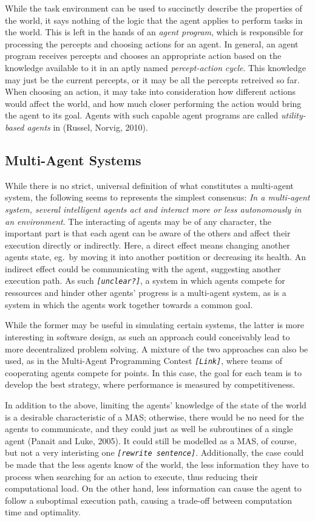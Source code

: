 While the task environment can be used to succinctly describe the
properties of the world, it says nothing of the logic that the agent
applies to perform tasks in the world. This is left in the hands of
an \emph{agent program}, which is responsible for processing the percepts
and choosing actions for an agent. In general, an agent program receives
percepts and chooses an appropriate action based on the knowledge
available to it in an aptly named \emph{percept-action} \emph{cycle}.
This knowledge may just be the current percepts, or it may be all
the percepts retreived so far. When choosing an action, it may take
into consideration how different actions would affect the world, and
how much closer performing the action would bring the agent to its
goal. Agents with such capable agent programs are called \emph{utility-based
agents} in (Russel, Norvig, 2010).


\subsection{Multi-Agent Systems}

While there is no strict, universal definition of what constitutes
a multi-agent system, the following seems to represents the simplest
consensus: \emph{In a multi-agent system, several intelligent agents
act and interact more or less autonomously in an environment}. The
interacting of agents may be of any character, the important part
is that each agent can be aware of the others and affect their execution
directly or indirectly. Here, a direct effect means changing another
agents state, eg.\ by moving it into another postition or decreasing
its health. An indirect effect could be communicating with the agent,
suggesting another execution path. As such \texttt{\emph{{[}unclear?{]}}},
a system in which agents compete for ressources and hinder other agents'
progress is a multi-agent system, as is a system in which the agents
work together towards a common goal. 

While the former may be useful in simulating certain systems, the
latter is more interesting in software design, as such an approach
could conceivably lead to more decentralized problem solving. A mixture
of the two approaches can also be used, as in the Multi-Agent Programming
Contest \texttt{\emph{{[}Link{]}}}, where teams of cooperating agents
compete for points. In this case, the goal for each team is to develop
the best strategy, where performance is measured by competitiveness.

In addition to the above, limiting the agents' knowledge of the state
of the world is a desirable characteristic of a MAS; otherwise, there
would be no need for the agents to communicate, and they could just
as well be subroutines of a single agent (Panait and Luke, 2005).
It could still be modelled as a MAS, of course, but not a very interisting
one \texttt{\emph{{[}rewrite sentence{]}}}. Additionally, the case
could be made that the less agents know of the world, the less information
they have to process when searching for an action to execute, thus
reducing their computational load. On the other hand, less information
can cause the agent to follow a suboptimal execution path, causing
a trade-off between computation time and optimality. 

